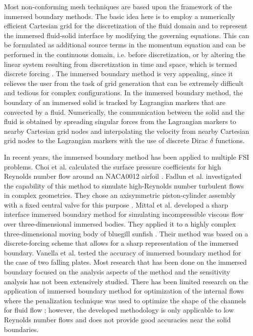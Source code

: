\documentclass[12pt]{aiaa-pretty}
\begin{document}
Most non-conforming mesh techniques are based upon the framework of the immersed boundary methods. The basic idea here is to employ a numerically efficient Cartesian grid for the discretization of the fluid domain and to represent the immersed fluid-solid interface by modifying the governing equations. This can be formulated as additional source terms in the momentum equation and can be performed in the continuous domain, i.e. before discretization, or by altering the linear system resulting from discretization in time and space, which is termed discrete forcing \cite{mittal2005immersed}. The immersed boundary method is very appealing, since it relieves the user from the task of grid generation that can be extremely difficult and tedious for complex configurations. In the immersed boundary method, the boundary of an immersed solid is tracked by Lagrangian markers that are convected by a fluid. Numerically, the communication between the solid and the fluid is obtained by spreading singular forces from the Lagrangian markers to nearby Cartesian grid nodes and interpolating the velocity from nearby Cartesian grid nodes to the Lagrangian markers with the use of discrete Dirac $\delta$ functions.

In recent years, the immersed boundary method has been applied to multiple FSI problems. Choi et al. calculated the surface pressure coefficients for high Reynolds number flow around an NACA0012 airfoil \cite{choi2007immersed}. Fadlun et al. investigated the capability of this method to simulate high-Reynolds number turbulent flows in complex geometries. They chose an axisymmetric piston-cylinder assembly with a fixed central valve for this purpose \cite{fadlun2000combined}. Mittal et al. developed a sharp interface immersed boundary method for simulating incompressible viscous flow over three-dimensional immersed bodies. They applied it to a highly complex three-dimensional moving body of bluegill sunfish \cite{mittal2008versatile}. Their method was based on a discrete-forcing scheme that allows for a sharp representation of the immersed boundary. Vanella et al. tested the accuracy of immersed boundary method for the case of two falling plates. Most research that has been done on the immersed boundary focused on the analysis aspects of the method and the sensitivity analysis has not been extensively studied. There has been limited research on the application of immersed boundary method for optimization of the internal flows where the penalization technique was used to optimize the shape of the channels for fluid flow \cite{challis2009level, kreissl2012levelset}; however, the developed methodology is only applicable to low Reynolds number flows and does not provide good accuracies near the solid boundaries.
\end{document}
